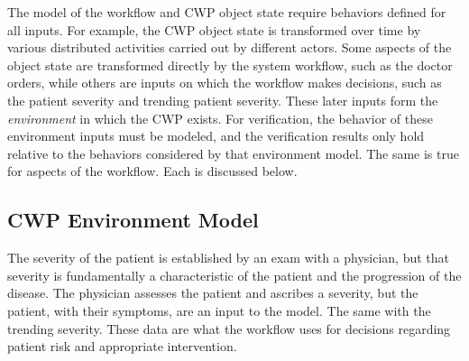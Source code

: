 The model of the workflow and CWP object state require behaviors defined for all inputs.
For example, the CWP object state is transformed over time by various distributed activities carried out by different actors.
Some aspects of the object state are transformed directly by the system workflow, such as the doctor orders, while others are inputs on which the workflow makes decisions, such as the patient severity and trending patient severity. These later inputs form the \emph{environment} in which the CWP exists.
For verification, the behavior of these environment inputs must be modeled, and the verification results only hold relative to the behaviors considered by that environment model.
The same is true for aspects of the workflow. Each is discussed below.

\subsection{CWP Environment Model}
The severity of the patient is established by an exam with a physician, but that severity is fundamentally a characteristic of the patient and the progression of the disease.
The physician assesses the patient and ascribes a severity, but the patient, with their symptoms, are an input to the model.
The same with the trending severity.
These data are what the workflow uses for decisions regarding patient risk and appropriate intervention. 

\begin{comment}
There is, of course, a causal relationship between the decisions in a workflow and the resulting subsequent input.
For example, it is normally expected that when a doctor orders a patient admitted to the hospital that at some point in the future the severity rating for the patient diminishes due to the increased level of intervention and care.
Here is where modeling choices can limit the impact, and meaning, of any verification results as the verification only hold for the modeled input behavior.

The intent is to create the weakest (e.g., the least restrictive) environment model possible in which a workflow is able to be verified.
That means the environment model includes behavior that exists in the real world, and it includes behaviors that do not exist in the real world resulting in a \emph{sound over-approximation} of feasible environment behavior.
If a workflow verifies in the sound over-approximated environment, then by implication, that verification result holds in the real world since those behaviors are a subset of the ones considered for verification.
\end{comment}

